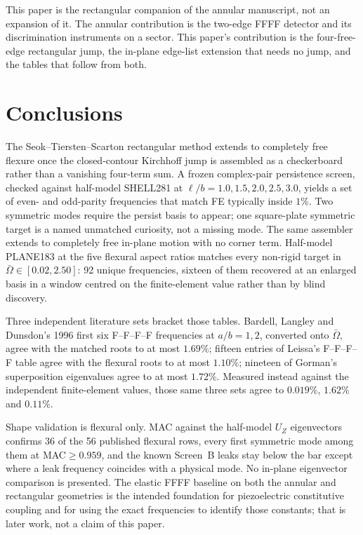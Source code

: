 \documentclass[11pt]{article}
\begin{document}
This paper is the rectangular companion of the annular manuscript, not
an expansion of it. The annular contribution is the two-edge FFFF
detector and its discrimination instruments on a sector. This paper's
contribution is the four-free-edge rectangular jump, the in-plane
edge-list extension that needs no jump, and the tables that follow from
both.

\section{Conclusions}\label{sec:conc}
The Seok--Tiersten--Scarton rectangular method extends to completely free
flexure once the closed-contour Kirchhoff jump is assembled as a
checkerboard rather than a vanishing four-term sum. A frozen complex-pair
persistence screen, checked against half-model SHELL281 at
$\ell/b=1.0,1.5,2.0,2.5,3.0$, yields a set of even- and odd-parity
frequencies that match FE typically inside $1\%$. Two symmetric modes
require the persist basis to appear; one square-plate symmetric target is
a named unmatched curiosity, not a missing mode. The same assembler
extends to completely free in-plane motion with no corner term.
Half-model PLANE183 at the five flexural aspect ratios matches every
non-rigid target in $\bar\Omega\in[0.02,2.50]$: 92 unique frequencies,
sixteen of them recovered at an enlarged basis in a window centred on the
finite-element value rather than by blind discovery.

Three independent literature sets bracket those tables. Bardell, Langley
and Dunsdon's 1996 first six F--F--F--F frequencies at $a/b=1,2$, converted
onto $\bar\Omega$, agree with the matched roots to at most $1.69\%$;
fifteen entries of Leissa's F--F--F--F table agree with the flexural roots
to at most $1.10\%$; nineteen of Gorman's superposition eigenvalues agree
to at most $1.72\%$. Measured instead against the independent
finite-element values, those same three sets agree to $0.019\%$, $1.62\%$
and $0.11\%$.

Shape validation is flexural only. MAC against the half-model $U_Z$
eigenvectors confirms 36 of the 56 published flexural rows, every first
symmetric mode among them at MAC${}\ge 0.959$, and the known Screen~B
leaks stay below the bar except where a leak frequency coincides with a
physical mode. No in-plane eigenvector comparison is presented. The elastic
FFFF baseline on both the annular \cite{mccune2026annular} and rectangular
geometries is the intended foundation for piezoelectric constitutive
coupling and for using the exact frequencies to identify those constants;
that is later work, not a claim of this paper.
\end{document}
